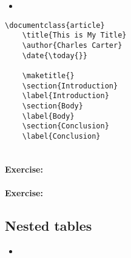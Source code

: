         \begin{framed}
            \begin{itemize}
                \item{}
            \end{itemize}
        \end{framed}


        \begin{verbatim}
\documentclass{article}
    \title{This is My Title}
    \author{Charles Carter}
    \date{\today{}}
 
    \maketitle{}
    \section{Introduction}
    \label{Introduction}
    \section{Body}
    \label{Body}
    \section{Conclusion}
    \label{Conclusion}
    
        \end{verbatim}

        \paragraph{Exercise:}

        \paragraph{Exercise:}


        \subsection{Nested tables}
        \label{Nested tables}
        
        \begin{framed}
            \begin{itemize}
                \item{}
            \end{itemize}
        \end{framed}


